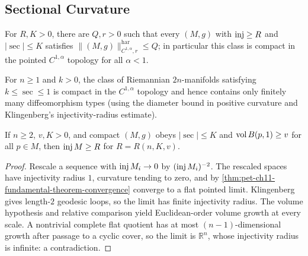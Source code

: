 \subsection{Sectional Curvature}

\begin{theorem}
  \label{thm:pet-ch11-convergence-theorem-riemannian-geometry}

  For $R,K>0$, there are $Q,r>0$ such that every $(M,g)$ with $\operatorname{inj}\ge R$
  and $|\sec|\le K$ satisfies
  $\|(M,g)\|^{\mathrm{har}}_{C^{1,\alpha},r}\le Q$; in
  particular this class is compact in the pointed $C^{1,\alpha}$ topology for
  all $\alpha<1$.
\end{theorem}

\begin{corollary}
  \label{cor:pet-ch11-cheeger-even-dim-finiteness}

  For $n\ge1$ and $k>0$, the class of Riemannian $2n$-manifolds satisfying
  $k\le\sec\le1$ is compact in the $C^{1,\alpha}$ topology and hence contains
  only finitely many diffeomorphism types (using the diameter bound in
  positive curvature and Klingenberg's injectivity-radius estimate).
\end{corollary}

\begin{lemma}
  \label{lem:pet-ch11-cheeger-injectivity-radius-lemma}

  If $n\ge2$, $v,K>0$, and compact $(M,g)$ obeys
  $|\sec|\le K$ and $\operatorname{vol} B(p,1)\ge v$ for all $p\in M$, then $\operatorname{inj} M\ge R$
  for $R=R(n,K,v)$.
\end{lemma}
\begin{proof}
  \sketch
  Rescale a sequence with \(\operatorname{inj} M_i\to0\) by \((\operatorname{inj} M_i)^{-2}\). The rescaled spaces have injectivity radius \(1\), curvature tending to zero, and by \cref{thm:pet-ch11-fundamental-theorem-convergence} converge to a flat pointed limit. Klingenberg gives length-\(2\) geodesic loops, so the limit has finite injectivity radius. The volume hypothesis and relative comparison yield Euclidean-order volume growth at every scale. A nontrivial complete flat quotient has at most \((n-1)\)-dimensional growth after passage to a cyclic cover, so the limit is \(\mathbb R^n\), whose injectivity radius is infinite: a contradiction.
\end{proof}


